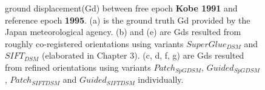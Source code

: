 \begin{figure}[htbp]
\begin{center}
		\caption{{\scriptsize ground displacement(Gd) between free epoch \textbf{Kobe 1991} and reference epoch \textbf{1995}. (a) is the ground truth Gd provided by the Japan meteorological agency. (b) and (e) are Gds resulted from roughly co-registered orientations using variants $SuperGlue_{DSM}$ and $SIFT_{DSM}$ (elaborated in Chapter 3). (c, d, f, g) are Gds resulted from refined orientations using variants $Patch_{SpGDSM}$, $Guided_{SpGDSM}$, $Patch_{SIFTDSM}$ and $Guided_{SIFTDSM}$ individually.}}
		\label{GdKobe}
	\end{center}
\end{figure} 

